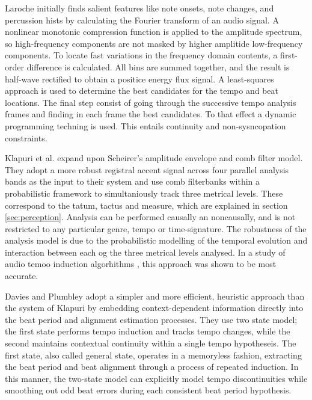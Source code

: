 \documentclass{scrartcl}
\begin{document}

Laroche \cite{Laroche2003} initially finds salient features like note onsets, note changes, and percussion hists by calculating the Fourier transform of an audio signal. A nonlinear monotonic compression function is applied to the amplitude spectrum, so high-frequency components are not masked by higher amplitide low-frequency components. To locate fast variations in the frequency domain contents, a first-order difference is calculated. All bins are summed together, and the result is half-wave rectified to obtain a positice energy flux signal. A least-squares approach is used to determine the best candidates for the tempo and beat locations. The final step consist of going through the successive tempo analysis frames and finding in each frame the best candidates. To that effect a dynamic programming techning is used. This entails continuity and non-sysncopation constraints. 

Klapuri et al. \cite{Klapuri2005} expand upon Scheirer's amplitude envelope and comb filter model. They adopt a more robust registral accent signal across four parallel analysis bands as the input to their system and use comb filterbanks within a probabilistic framework to simultaniously track three metrical levels. These correspond to the tatum, tactus and measure, which are explained in section \ref{sec:perception}. Analysis can be performed causally an noncausally, and is not restricted to any particular genre, tempo or time-signature. The robustness of the analysis model is due to the probabilistic modelling of the temporal evolution and interaction between each og the three metrical levels analysed. In a study of audio temoo induction algorhithms \cite{Gouyon2006b}, this approach was shown to be most accurate.

Davies and Plumbley \cite{Davies2007} adopt a simpler and more efficient, heuristic approach than the system of Klapuri by embedding context-dependent information directly into the beat period and alignment estimation processes. They use two state model; the first state performs tempo induction and tracks tempo changes, while the second maintains contextual continuity within a single tempo hypotheseis. The first state, also called general state, operates in a memoryless fashion, extracting the beat period and beat alignment through a process of repeated induction. In this manner, the two-state model can explicitly model tempo discontinuities while smoothing out odd beat errors during each consistent beat period hypothesis. 
\end{document}
